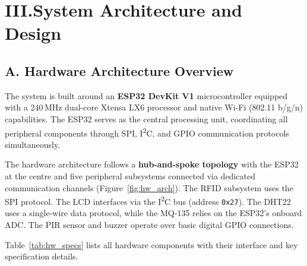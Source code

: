 \documentclass[12pt,a4paper]{article}
\begin{document}
\section*{III.\quad System Architecture and Design}

\subsection*{A. Hardware Architecture Overview}

The system is built around an \textbf{ESP32 DevKit V1} microcontroller equipped with a
240\,MHz dual-core Xtensa LX6 processor and native Wi-Fi (802.11 b/g/n) capabilities.
The ESP32 serves as the central processing unit, coordinating all peripheral components
through SPI, I\textsuperscript{2}C, and GPIO communication protocols simultaneously.

The hardware architecture follows a \textbf{hub-and-spoke topology} with the ESP32 at the
centre and five peripheral subsystems connected via dedicated communication channels
(Figure~\ref{fig:hw_arch}). The RFID subsystem uses the SPI protocol. The LCD
interfaces via the I\textsuperscript{2}C bus (address \texttt{0x27}). The DHT22 uses a single-wire
data protocol, while the MQ-135 relies on the ESP32's onboard ADC. The PIR sensor
and buzzer operate over basic digital GPIO connections.

Table~\ref{tab:hw_specs} lists all hardware components with their interface and key
specification details.
\end{document}
